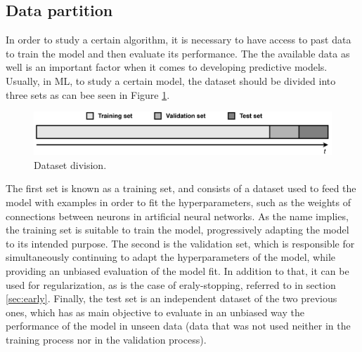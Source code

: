 \subsection{Data partition}\label{sec:datap}

In order to study a certain algorithm, it is necessary to have access to past data to train the model and then evaluate its performance. The the available data as well is an important factor when it comes to developing predictive models. Usually, in \ac{ML}, to study a certain model, the dataset should be divided into three sets as can bee seen in Figure \ref{division}. 

\begin{figure}[h!]
    \centering
    \begin{center}
    \includegraphics[width=1\textwidth]{Images/division.png}
    \caption{Dataset division.}
    \label{division}
    \end{center}
\end{figure}

The first set is known as a training set, and consists of a dataset used to feed the model with examples in order to fit the hyperparameters, such as the weights of connections between neurons in artificial neural networks. As the name implies, the training set is suitable to train the model, progressively adapting the model to its intended purpose. The second is the validation set, which is responsible for simultaneously continuing to adapt the hyperparameters of the model, while providing an unbiased evaluation of the model fit. In addition to that, it can be used for regularization, as is the case of eraly-stopping, referred to in section \ref{sec:early}. Finally, the test set is an independent dataset of the two previous ones, which has as main objective to evaluate in an unbiased way the performance of the model in unseen data (data that was not used neither in the training process nor in the validation process). 

